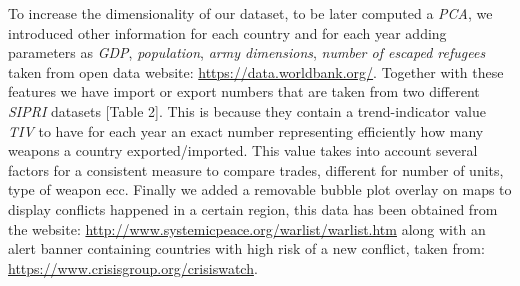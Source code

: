 \documentclass{article}
\begin{document}
\begin{multicols}{2}
To increase the dimensionality of our dataset, to be later computed a \textit{PCA}, we introduced other information for each country and for each year adding parameters as \textit{GDP}, \textit{population}, \textit{army dimensions}, \textit{number of escaped refugees} taken from open data website: \url{https://data.worldbank.org/}. 
Together with these features we have import or export numbers that are taken from two different \textit{SIPRI} datasets [Table 2]. This is because they contain a trend-indicator value \textit{TIV} to have for each year an exact number representing efficiently how many weapons a country exported/imported. This value takes into account several factors for a consistent measure to compare trades, different for number of units, type of weapon ecc.
Finally we added a removable bubble plot overlay on maps to display conflicts happened in a certain region, this data has been obtained from the website: \url{http://www.systemicpeace.org/warlist/warlist.htm} along with an alert banner containing countries with high risk of a new conflict, taken from:  \url{https://www.crisisgroup.org/crisiswatch}.  





\begin{center}
\begin{table}[ht]

\label{tab: d1}
\caption { \label { tab:d1} Attributes of dataset in \texttt{Trade-Register-1990-2018.csv} file.  }

\end{table}
\end{center}


\end{multicols}
\end{document}
